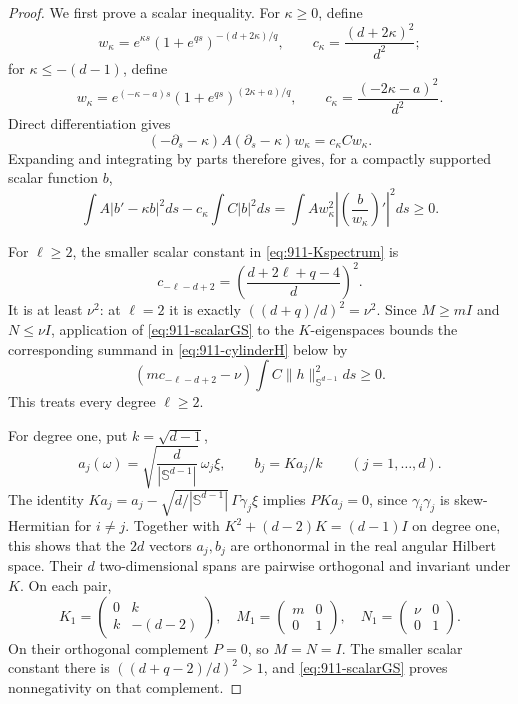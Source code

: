 \documentclass[11pt,a4paper]{article}
\theoremstyle{remark}
\begin{document}
\begin{proof}
We first prove a scalar inequality. For $\kappa\ge0$, define
\[
 w_\kappa=e^{\kappa s}(1+e^{qs})^{-(d+2\kappa)/q},
 \qquad c_\kappa=\frac{(d+2\kappa)^2}{d^2};
\]
for $\kappa\le-(d-1)$, define
\[
 w_\kappa=e^{(-\kappa-a)s}(1+e^{qs})^{(2\kappa+a)/q},
 \qquad c_\kappa=\frac{(-2\kappa-a)^2}{d^2}.
\]
Direct differentiation gives
\[
 (-\partial_s-\kappa)A(\partial_s-\kappa)w_\kappa
     =c_\kappa Cw_\kappa.
\]
Expanding and integrating by parts therefore gives, for a compactly
supported scalar function $b$,
\begin{equation}\label{eq:911-scalarGS}
 \int A|b'-\kappa b|^2ds-c_\kappa\int C|b|^2ds
 =\int A w_\kappa^2
       \left|\left(\frac b{w_\kappa}\right)'\right|^2ds\ge0.
\end{equation}

For $\ell\ge2$, the smaller scalar constant in
\eqref{eq:911-Kspectrum} is
\[
 c_{-\ell-d+2}=
 \left(\frac{d+2\ell+q-4}{d}\right)^2.
\]
It is at least $\nu^2$: at $\ell=2$ it is exactly
$((d+q)/d)^2=\nu^2$. Since $M\ge mI$ and $N\le\nu I$, application of
\eqref{eq:911-scalarGS} to the $K$-eigenspaces bounds the corresponding
summand in \eqref{eq:911-cylinderH} below by
\[
 (m c_{-\ell-d+2}-\nu)\int C\|h\|_{\mathbb S^{d-1}}^2ds\ge0.
\]
This treats every degree $\ell\ge2$.

For degree one, put $k=\sqrt{d-1}$,
\[
 a_j(\omega)=\sqrt{\frac d{|\mathbb S^{d-1}|}}\,\omega_j\xi,
 \qquad b_j=Ka_j/k\qquad(j=1,\ldots,d).
\]
The identity $Ka_j=a_j-\sqrt{d/|\mathbb S^{d-1}|}\,\Gamma\gamma_j\xi$
implies $PKa_j=0$, since $\gamma_i\gamma_j$ is skew-Hermitian for $i\ne j$.
Together with $K^2+(d-2)K=(d-1)I$ on degree one, this shows that the
$2d$ vectors $a_j,b_j$ are orthonormal in the real angular Hilbert space.
Their $d$ two-dimensional spans are pairwise orthogonal and invariant
under $K$. On each pair,
\begin{equation}\label{eq:911-l1matrices}
 K_1=\begin{pmatrix}0&k\\k&-(d-2)\end{pmatrix},\quad
 M_1=\begin{pmatrix}m&0\\0&1\end{pmatrix},\quad
 N_1=\begin{pmatrix}\nu&0\\0&1\end{pmatrix}.
\end{equation}
On their orthogonal complement $P=0$, so $M=N=I$. The smaller scalar
constant there is $((d+q-2)/d)^2>1$, and
\eqref{eq:911-scalarGS} proves nonnegativity on that complement.


\end{proof}
\end{document}
